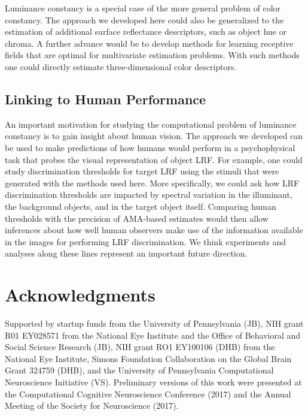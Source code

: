 \documentclass{jov}
\begin{document}
Luminance constancy is a special case of the more general problem of color constancy.
The approach we developed here could also be generalized to the estimation of additional surface reflectance descriptors, such as object hue or chroma.
A further advance would be to develop methods for learning receptive fields that are optimal for multivariate estimation problems. 
With such methods one could directly estimate three-dimensional color descriptors.

\subsection{Linking to Human Performance}

An important motivation for studying the computational problem of luminance constancy is to gain insight about human vision.
The approach we developed can be used to make predictions of how humans would perform in a psychophysical task that probes the visual representation of object LRF.
For example, one could study discrimination thresholds for target LRF using the stimuli that were generated with the methods used here.
More specifically, we could ask how LRF discrimination thresholds are impacted by spectral variation in the illuminant, the background objects, and in the target object itself.
Comparing human thresholds with the precision of AMA-based estimates would then allow inferences about how well human observers make use of the information available in the images for performing LRF discrimination.
We think experiments and analyses along these lines represent an important future direction.

\section{Acknowledgments} \label{Acknowledgments}

Supported by startup funds from the University of Pennsylvania (JB), NIH grant R01 EY028571 from the National Eye Institute and the Office of Behavioral and Social Science Research (JB), NIH grant RO1 EY100106 (DHB) from the National Eye Institute, Simons Foundation Collaboration on the Global Brain Grant 324759 (DHB), and the University of Pennsylvania Computational Neuroscience Initiative (VS).  Preliminary versions of this work were presented at the Computational Cognitive Neuroscience Conference (2017) and the Annual Meeting of the Society for Neuroscience (2017).



\end{document}
